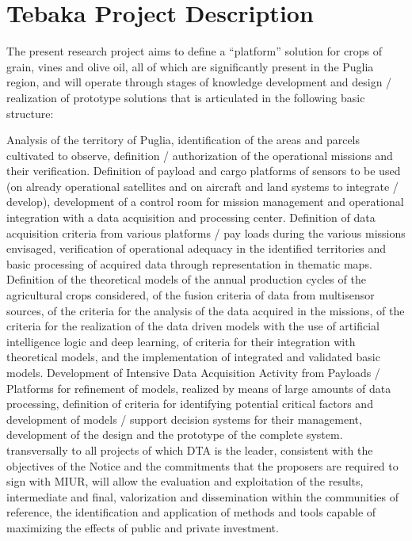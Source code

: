 \documentclass[a4paper, comsoc]{IEEEtran}
\begin{document}
\section{Tebaka Project Description}\label{sec:tebaka}

The present research project aims to define a “platform” solution for crops of grain, vines and olive oil, all of which are significantly present in the Puglia region, and will operate through stages of knowledge development and design / realization of prototype solutions that is articulated in the following basic structure:

Analysis of the territory of Puglia, identification of the areas and parcels cultivated to observe, definition / authorization of the operational missions and their verification.
Definition of payload and cargo platforms of sensors to be used (on already operational satellites and on aircraft and land systems to integrate / develop), development of a control room for mission management and operational integration with a data acquisition and processing center.
Definition of data acquisition criteria from various platforms / pay loads during the various missions envisaged, verification of operational adequacy in the identified territories and basic processing of acquired data through representation in thematic maps.
Definition of the theoretical models of the annual production cycles of the agricultural crops considered, of the fusion criteria of data from multisensor sources, of the criteria for the analysis of the data acquired in the missions, of the criteria for the realization of the data driven models with the use of artificial intelligence logic and deep learning, of criteria for their integration with theoretical models, and the implementation of integrated and validated basic models.
Development of Intensive Data Acquisition Activity from Payloads / Platforms for refinement of models, realized by means of large amounts of data processing, definition of criteria for identifying potential critical factors and development of models / support decision systems for their management, development of the design and the prototype of the complete system.
transversally to all projects of which DTA is the leader, consistent with the objectives of the Notice and the commitments that the proposers are required to sign with MIUR, will allow the evaluation and exploitation of the results, intermediate and final, valorization and dissemination within the communities of reference, the identification and application of methods and tools capable of maximizing the effects of public and private investment.
 
\end{document}
